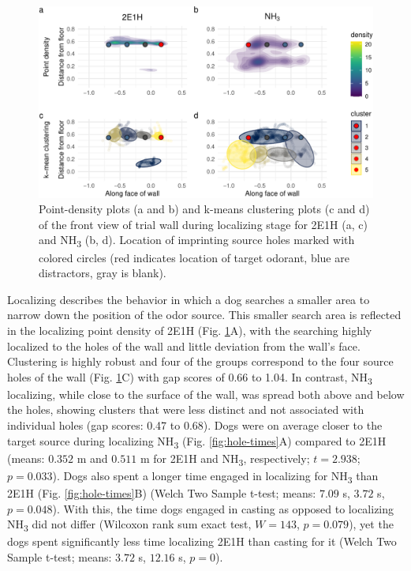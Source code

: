 \documentclass[
]{article}
\begin{document}
\begin{figure}
\centering
\includegraphics{main-manuscript_files/figure-latex/frontwall-detailing-1.pdf}
\caption{\label{fig:frontwall-detailing}Point-density plots (a and b) and k-means clustering plots (c and d) of the front view of trial wall during localizing stage for 2E1H (a, c) and NH\textsubscript{3} (b, d). Location of imprinting source holes marked with colored circles (red indicates location of target odorant, blue are distractors, gray is blank).}
\end{figure}

Localizing describes the behavior in which a dog searches a smaller area to narrow down the position of the odor source. This smaller search area is reflected in the localizing point density of 2E1H (Fig. \ref{fig:frontwall-detailing}A), with the searching highly localized to the holes of the wall and little deviation from the wall's face. Clustering is highly robust and four of the groups correspond to the four source holes of the wall (Fig. \ref{fig:frontwall-detailing}C) with gap scores of 0.66 to 1.04. In contrast, NH\textsubscript{3} localizing, while close to the surface of the wall, was spread both above and below the holes, showing clusters that were less distinct and not associated with individual holes (gap scores: 0.47 to 0.68). Dogs were on average closer to the target source during localizing NH\textsubscript{3} (Fig. \ref{fig:hole-times}A) compared to 2E1H (means: \(0.352\) m and \(0.511\) m for 2E1H and NH\textsubscript{3}, respectively; \(t = 2.938\); \(p = 0.033\)). Dogs also spent a longer time engaged in localizing for NH\textsubscript{3} than 2E1H (Fig. \ref{fig:hole-times}B) (Welch Two Sample t-test; means: \(7.09\) s, \(3.72\) s, \(p = 0.048\)). With this, the time dogs engaged in casting as opposed to localizing NH\textsubscript{3} did not differ (Wilcoxon rank sum exact test, \(W = 143\), \(p = 0.079\)), yet the dogs spent significantly less time localizing 2E1H than casting for it (Welch Two Sample t-test; means: \(3.72\) s, \(12.16\) s, \(p = 0\)).
\end{document}
